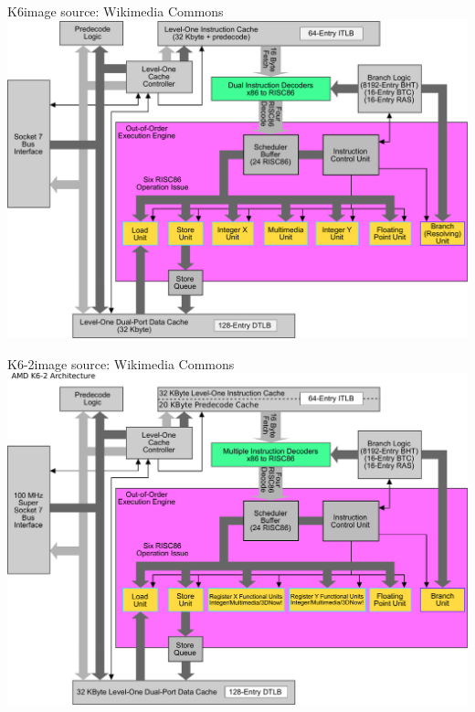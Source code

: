 \documentclass[mathserif,xcolor={dvipsnames,table}]{beamer}
\begin{document}
\begin{frame}{K6\hfill\tiny{image source: Wikimedia Commons}}
\includegraphics[width=\textwidth]{images/k6.pdf}
\end{frame}

\begin{frame}{K6-2\hfill\tiny{image source: Wikimedia Commons}}
\includegraphics[width=\textwidth]{images/k62.pdf}
\end{frame}
\end{document}
